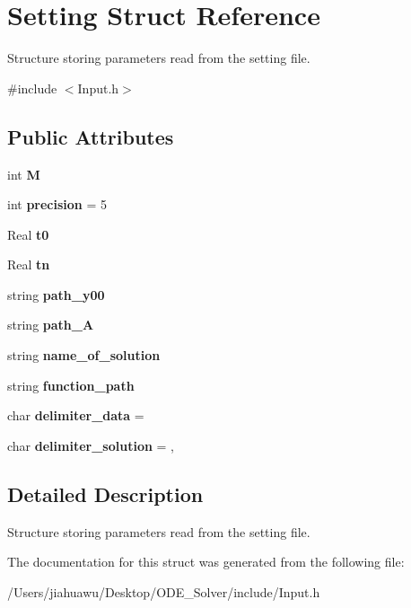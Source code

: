 \hypertarget{struct_setting}{}\section{Setting Struct Reference}
\label{struct_setting}


Structure storing parameters read from the setting file.  




{\ttfamily \#include $<$Input.\+h$>$}

\subsection*{Public Attributes}
\begin{DoxyCompactItemize}
\item 
\mbox{\label{struct_setting_a7d0cd8484c787085547a178a311239bd}} 
int {\bfseries M}
\item 
\mbox{\label{struct_setting_ab12392850916088ffc92d7eeccf84950}} 
int {\bfseries precision} = 5
\item 
\mbox{\label{struct_setting_a60b5d988c449e64b535813eeff85a55b}} 
Real {\bfseries t0}
\item 
\mbox{\label{struct_setting_a18996fc4e88679942fc70d4379053d77}} 
Real {\bfseries tn}
\item 
\mbox{\label{struct_setting_a9f9d6c2e92d90956166bbe755200c3a5}} 
string {\bfseries path\+\_\+y00}
\item 
\mbox{\label{struct_setting_aced1bbb9f4dc3f67c971cbac3f71c4ec}} 
string {\bfseries path\+\_\+A}
\item 
\mbox{\label{struct_setting_a5fe3aabb36cb7eee6fa7ff7e6c19df4c}} 
string {\bfseries name\+\_\+of\+\_\+solution}
\item 
\mbox{\label{struct_setting_a1077714cd4602c069c372bc18816959d}} 
string {\bfseries function\+\_\+path}
\item 
\mbox{\label{struct_setting_ab533af9e0e9b0f0d574e8caa57fc5c49}} 
char {\bfseries delimiter\+\_\+data} = \textquotesingle{} \textquotesingle{}
\item 
\mbox{\label{struct_setting_a408ec115a7aef35d1ea1822417b75701}} 
char {\bfseries delimiter\+\_\+solution} = \textquotesingle{},\textquotesingle{}
\end{DoxyCompactItemize}


\subsection{Detailed Description}
Structure storing parameters read from the setting file. 

The documentation for this struct was generated from the following file\+:\begin{DoxyCompactItemize}
\item 
/\+Users/jiahuawu/\+Desktop/\+O\+D\+E\+\_\+\+Solver/include/Input.\+h\end{DoxyCompactItemize}
